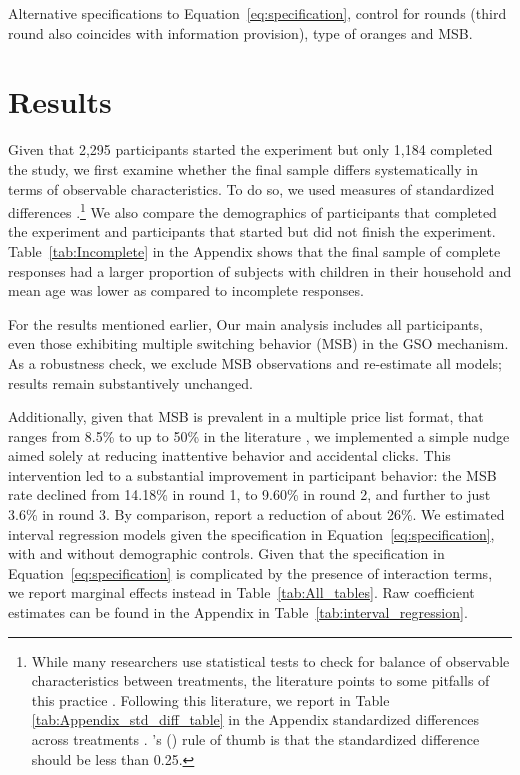 \documentclass[12pt]{article}
\newcommand\citeapos[1]{\citeauthor{#1}'s (\citeyear{#1})} %
\begin{document}
Alternative specifications to Equation~\ref{eq:specification}, control for rounds (third round also coincides with information provision), type of oranges and MSB.

\section{Results}
\label{Results}


Given that 2,295 participants started the experiment but only 1,184 completed the study, we first examine whether the final sample differs systematically in terms of observable characteristics. To do so, we used measures of standardized differences \citep{CochranRubin1973}.\footnote{While many researchers use statistical tests to check for balance of observable characteristics between treatments, the literature points to some pitfalls of this practice \citep[e.g.,][]{canavari2019run,DeatonCartwright2016,BrizEtAl2017,HoEtAl2007,MoherEtAl2010,MutzPemantle2015}. Following this literature, we report in Table \ref{tab:Appendix_std_diff_table} in the Appendix standardized differences across treatments \citep{ImbensRubin2016,ImbensWooldridge2009}. \citeapos{CochranRubin1973} rule of thumb is that the standardized difference should be less than 0.25.}  We also compare the demographics of participants that completed the experiment and participants that started but did not finish the experiment. Table~\ref{tab:Incomplete} in the Appendix shows that the final sample of complete responses had a larger proportion of subjects with children in their household and mean age was lower as compared to incomplete responses.

For the results mentioned earlier, Our main analysis includes all participants, even those exhibiting multiple switching behavior (MSB) in the GSO mechanism. As a robustness check, we exclude MSB observations and re-estimate all models; results remain substantively unchanged.

Additionally, given that MSB is prevalent in a multiple price list format, that ranges from 8.5\%  to up to 50\% in the literature \citep{yu2021multiple, filippin2016reconsideration}, we implemented a simple nudge aimed solely at reducing inattentive behavior and accidental clicks. This intervention led to a substantial improvement in participant behavior: the MSB rate declined from 14.18\% in round 1, to 9.60\% in round 2, and further to just 3.6\% in round 3. By comparison, \citet{yu2021multiple} report a reduction of about 26\%.
We estimated interval regression models given the specification in Equation~\ref{eq:specification}, with and without demographic controls. Given that the specification in Equation~\ref{eq:specification} is complicated by the presence of interaction terms, we report marginal effects instead in Table~\ref{tab:All_tables}. Raw coefficient estimates can be found in the Appendix in Table~\ref{tab:interval_regression}.
\end{document}
